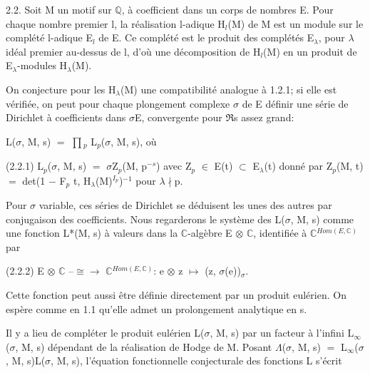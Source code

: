 \documentclass[10pt,twoside]{article}
\begin{document}
2.2. Soit M un motif sur \ensuremath{ℚ}, à coefficient dans un corps de nombres E. Pour chaque nombre premier l, la réalisation l-adique H\ensuremath{_{l}}(M) de M est un module sur le complété l-adique E\ensuremath{_{l}} de E. Ce complété est le produit des complétés E\ensuremath{_{λ}}, pour \ensuremath{λ} idéal premier au-dessus de l, d’où une décomposition de H\ensuremath{_{l}}(M) en un produit de E\ensuremath{_{λ}}-modules H\ensuremath{_{λ}}(M).\par
On conjecture pour les H\ensuremath{_{λ}}(M) une compatibilité analogue à 1.2.1; si elle est vérifiée, on peut pour chaque plongement complexe \ensuremath{σ} de E définir une série de Dirichlet à coefficients dans \ensuremath{σ}E, convergente pour \ensuremath{ℜ}s assez grand:\par
L(\ensuremath{σ}, M, s) \ensuremath{=} \ensuremath{∏}\ensuremath{_{p}} L\ensuremath{_{p}}(\ensuremath{σ}, M, s), où\par
(2.2.1)    L\ensuremath{_{p}}(\ensuremath{σ}, M, s) \ensuremath{=} \ensuremath{σ}Z\ensuremath{_{p}}(M, p\ensuremath{^{−s}}) avec Z\ensuremath{_{p}} \ensuremath{∈} E(t) \ensuremath{⊂} E\ensuremath{_{λ}}(t) donné par Z\ensuremath{_{p}}(M, t) \ensuremath{=} det(1 \ensuremath{−} F\ensuremath{_{p}} t, H\ensuremath{_{λ}}(M)\ensuremath{^{I_p}})\ensuremath{^{−1}} pour \ensuremath{λ}\ensuremath{∤}p.\par
Pour \ensuremath{σ} variable, ces séries de Dirichlet se déduisent les unes des autres par conjugaison des coefficients. Nous regarderons le système des L(\ensuremath{σ}, M, s) comme une fonction L*(M, s) à valeurs dans la \ensuremath{ℂ}-algèbre E \ensuremath{⊗} \ensuremath{ℂ}, identifiée à \ensuremath{ℂ}\ensuremath{^{Hom(E,ℂ)}} par\par
(2.2.2)    E \ensuremath{⊗} \ensuremath{ℂ} --\ensuremath{≅}\ensuremath{→} \ensuremath{ℂ}\ensuremath{^{Hom(E,ℂ)}}: e \ensuremath{⊗} z \ensuremath{↦} (z, \ensuremath{σ}(e))\ensuremath{_{σ}}.\par
Cette fonction peut aussi être définie directement par un produit eulérien. On espère comme en 1.1 qu’elle admet un prolongement analytique en s.\par
Il y a lieu de compléter le produit eulérien L(\ensuremath{σ}, M, s) par un facteur à l’infini L\ensuremath{_{∞}}(\ensuremath{σ}, M, s) dépendant de la réalisation de Hodge de M. Posant \ensuremath{Λ}(\ensuremath{σ}, M, s) \ensuremath{=} L\ensuremath{_{∞}}(\ensuremath{σ}, M, s)L(\ensuremath{σ}, M, s), l’équation fonctionnelle conjecturale des fonctions L s’écrit\par
\end{document}
